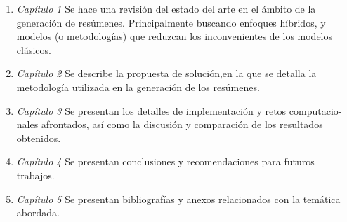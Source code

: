         \begin{enumerate}
            \item \emph{Capítulo 1} Se hace una revisión del estado del arte en el ámbito de la generación de resúmenes. Principalmente buscando enfoques híbridos, y modelos (o metodologías) que reduzcan los inconvenientes de los modelos clásicos.
            \item \emph{Capítulo 2} Se describe la propuesta de solución,en la que se detalla la metodología utilizada en la generación de los resúmenes.
            \item \emph{Capítulo 3} Se presentan los detalles de implementación y retos computacio-
            nales afrontados, así como la discusión y comparación de los resultados obtenidos.
            \item \emph{Capítulo 4} Se presentan conclusiones y recomendaciones para futuros trabajos.
            \item \emph{Capítulo 5} Se presentan bibliografías y anexos relacionados con la temática abordada.
        \end{enumerate}


